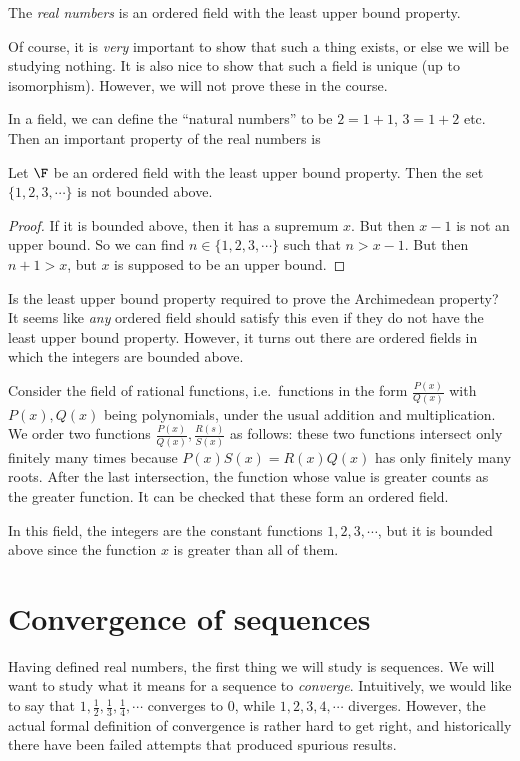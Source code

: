 \documentclass[a4paper]{article}
\begin{document}
\begin{defi}
  The \emph{real numbers} is an ordered field with the least upper bound property.
\end{defi}
Of course, it is \emph{very} important to show that such a thing exists, or else we will be studying nothing. It is also nice to show that such a field is unique (up to isomorphism). However, we will not prove these in the course.

In a field, we can define the ``natural numbers'' to be $2 = 1 + 1$, $3 = 1 + 2$ etc. Then an important property of the real numbers is
\begin{lemma}
  Let $\F$ be an ordered field with the least upper bound property. Then the set $\{1, 2, 3, \cdots\}$ is not bounded above.
\end{lemma}

\begin{proof}
  If it is bounded above, then it has a supremum $x$. But then $x - 1$ is not an upper bound. So we can find $n\in \{1, 2, 3, \cdots\}$ such that $n> x - 1$. But then $n + 1 > x$, but $x$ is supposed to be an upper bound.
\end{proof}

Is the least upper bound property required to prove the Archimedean property? It seems like \emph{any} ordered field should satisfy this even if they do not have the least upper bound property. However, it turns out there are ordered fields in which the integers are bounded above.

Consider the field of rational functions, i.e.\ functions in the form $\frac{P(x)}{Q(x)}$ with $P(x), Q(x)$ being polynomials, under the usual addition and multiplication. We order two functions $\frac{P(x)}{Q(x)}, \frac{R(s)}{S(x)}$ as follows: these two functions intersect only finitely many times because $P(x)S(x) = R(x)Q(x)$ has only finitely many roots. After the last intersection, the function whose value is greater counts as the greater function. It can be checked that these form an ordered field.

In this field, the integers are the constant functions $1, 2, 3, \cdots$, but it is bounded above since the function $x$ is greater than all of them.

\section{Convergence of sequences}
Having defined real numbers, the first thing we will study is sequences. We will want to study what it means for a sequence to \emph{converge}. Intuitively, we would like to say that $1, \frac{1}{2}, \frac{1}{3}, \frac{1}{4},\cdots$ converges to $0$, while $1, 2, 3, 4, \cdots$ diverges. However, the actual formal definition of convergence is rather hard to get right, and historically there have been failed attempts that produced spurious results.
\end{document}

